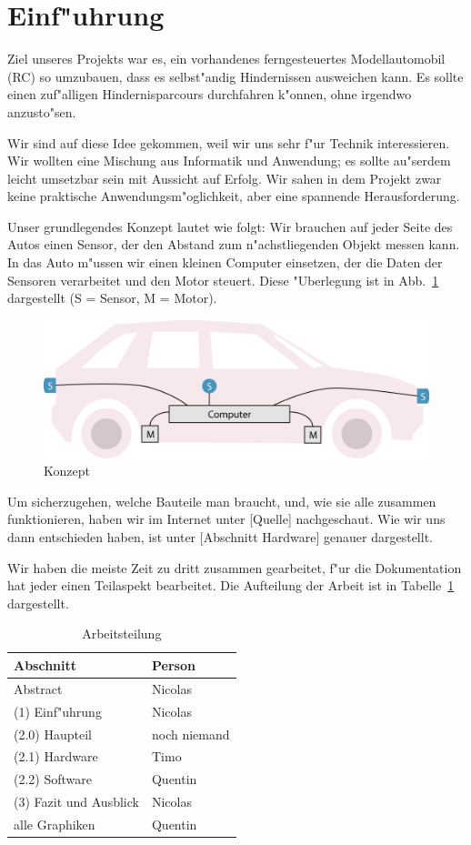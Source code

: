 \documentclass[a4paper,12pt]{article}
\begin{document}
\section{Einf"uhrung}\label{sec1}

Ziel unseres Projekts war es, ein vorhandenes ferngesteuertes Modellautomobil (RC) so umzubauen, dass es selbst"andig Hindernissen ausweichen kann.
Es sollte einen zuf"alligen Hindernisparcours durchfahren k"onnen, ohne irgendwo anzusto"sen.

Wir sind auf diese Idee gekommen, weil wir uns sehr f"ur Technik interessieren.
Wir wollten eine Mischung aus Informatik und Anwendung; es sollte au"serdem leicht umsetzbar sein mit Aussicht auf Erfolg.
Wir sahen in dem Projekt zwar keine praktische Anwendungsm"oglichkeit, aber eine spannende Herausforderung.

Unser grundlegendes Konzept lautet wie folgt:
Wir brauchen auf jeder Seite des Autos einen Sensor, der den Abstand zum n"achstliegenden Objekt messen kann.
In das Auto m"ussen wir einen kleinen Computer einsetzen, der die Daten der Sensoren verarbeitet und den Motor steuert.
Diese "Uberlegung ist in Abb.~\ref{Fig1} dargestellt (S = Sensor, M = Motor).

\begin{figure}[h]
	\centering
	\includegraphics[width=12cm]{./media/overview.png}
	\caption{Konzept}
	\label{Fig1}
\end{figure}

Um sicherzugehen, welche Bauteile man braucht, und, wie sie alle zusammen funktionieren, haben wir im Internet unter [Quelle] nachgeschaut.
Wie wir uns dann entschieden haben, ist unter [Abschnitt Hardware] genauer dargestellt.

Wir haben die meiste Zeit zu dritt zusammen gearbeitet, f"ur die Dokumentation hat jeder einen Teilaspekt bearbeitet.
Die Aufteilung der Arbeit ist in Tabelle~\ref{Tab1} dargestellt.

\begin{table}[h]
	\centering
	\begin{tabular}{|l|l|}
	\hline
		Abschnitt & Person \\ \hline
		Abstract & Nicolas \\
		(1) Einf"uhrung & Nicolas \\
		(2.0) Haupteil & noch niemand \\
		(2.1) Hardware & Timo \\
		(2.2) Software & Quentin \\
		(3) Fazit und Ausblick & Nicolas \\
		alle Graphiken & Quentin \\
	\hline
	\end{tabular}
	\caption{Arbeitsteilung}
	\label{Tab1}
\end{table}
\end{document}
